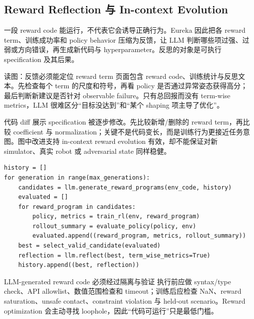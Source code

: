 \subsection{Reward Reflection 与 In-context Evolution}

一段 reward code 能运行，不代表它会诱导正确行为。Eureka 因此把各 reward term、训练成功率和 policy behavior 压缩为反馈，让 LLM 判断哪些项过强、过弱或方向错误，再生成新代码与 hyperparameter。反思的对象是可执行 specification 及其后果。


\begin{knowledgebox}{读图：反馈必须能定位 reward term}
页面包含 reward code、训练统计与反思文本。先检查每个 term 的尺度和符号，再看 policy 是否通过异常姿态获得高分；最后判断新建议是否针对 observable failure。只有总回报而没有 term-wise metrics，LLM 很难区分“目标没达到”和“某个 shaping 项主导了优化”。
\end{knowledgebox}


代码 diff 展示 specification 被逐步修改。先比较新增/删除的 reward term，再比较 coefficient 与 normalization；关键不是代码变长，而是训练行为更接近任务意图。图中改进支持 in-context reward evolution 有效，却不能保证对新 simulator、真实 robot 或 adversarial state 同样稳健。

\begin{lstlisting}[caption={Eureka 外层 reward generation 与内层 RL 训练循环的概念伪代码}]
history = []
for generation in range(max_generations):
    candidates = llm.generate_reward_programs(env_code, history)
    evaluated = []
    for reward_program in candidates:
        policy, metrics = train_rl(env, reward_program)
        rollout_summary = evaluate_policy(policy, env)
        evaluated.append((reward_program, metrics, rollout_summary))
    best = select_valid_candidate(evaluated)
    reflection = llm.reflect(best, term_wise_metrics=True)
    history.append((best, reflection))
\end{lstlisting}

\begin{warningbox}{LLM-generated reward code 必须经过隔离与验证}
执行前应做 syntax/type check、API allowlist、数值范围检查和 timeout；训练后应检查 NaN、reward saturation、unsafe contact、constraint violation 与 held-out scenario。Reward optimization 会主动寻找 loophole，因此“代码可运行”只是最低门槛。
\end{warningbox}

